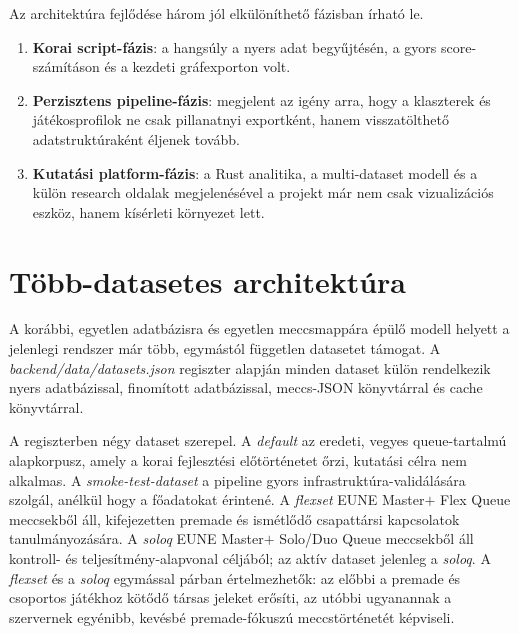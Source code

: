 Az architektúra fejlődése három jól elkülöníthető fázisban írható le.

\begin{enumerate}
    \item \textbf{Korai script-fázis}: a hangsúly a nyers adat begyűjtésén, a gyors score-számításon és a kezdeti gráfexporton volt.
    \item \textbf{Perzisztens pipeline-fázis}: megjelent az igény arra, hogy a klaszterek és játékosprofilok ne csak pillanatnyi exportként, hanem visszatölthető adatstruktúraként éljenek tovább.
    \item \textbf{Kutatási platform-fázis}: a Rust analitika, a multi-dataset modell és a külön research oldalak megjelenésével a projekt már nem csak vizualizációs eszköz, hanem kísérleti környezet lett.
\end{enumerate}

\section{Több-datasetes architektúra}

A korábbi, egyetlen adatbázisra és egyetlen meccsmappára épülő modell helyett a jelenlegi rendszer már több, egymástól független datasetet támogat. A \textit{backend/data/datasets.json} regiszter alapján minden dataset külön rendelkezik nyers adatbázissal, finomított adatbázissal, meccs-JSON könyvtárral és cache könyvtárral.

A regiszterben négy dataset szerepel. A \textit{default} az eredeti, vegyes queue-tartalmú alapkorpusz, amely a korai fejlesztési előtörténetet őrzi, kutatási célra nem alkalmas. A \textit{smoke-test-dataset} a pipeline gyors infrastruktúra-validálására szolgál, anélkül hogy a főadatokat érintené. A \textit{flexset} EUNE Master$+$ Flex Queue meccsekből áll, kifejezetten premade és ismétlődő csapattársi kapcsolatok tanulmányozására. A \textit{soloq} EUNE Master$+$ Solo/Duo Queue meccsekből áll kontroll- és teljesítmény-alapvonal céljából; az aktív dataset jelenleg a \textit{soloq}. A \textit{flexset} és a \textit{soloq} egymással párban értelmezhetők: az előbbi a premade és csoportos játékhoz kötődő társas jeleket erősíti, az utóbbi ugyanannak a szervernek egyénibb, kevésbé premade-fókuszú meccstörténetét képviseli.

